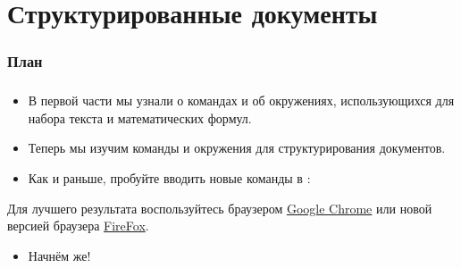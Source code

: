\documentclass{beamer}
\subtitle{Часть 2: Структурированные документы и не только}
\begin{document}
\begin{frame}
\titlepage
\end{frame}

\section{Структурированные документы}

\begin{frame}
\frametitle{План}
\vspace{-3ex}
\begin{multicols}{2}
\tableofcontents[currentsection]
\end{multicols}
\end{frame}

\begin{frame}
\frametitle{\insertsection}
\begin{itemize}
\item В первой части мы узнали о командах и об окружениях, использующихся
  для набора текста и математических формул.
\item Теперь мы изучим команды и окружения для структурирования документов.
\item Как и раньше, пробуйте вводить новые команды в \wllogo{}:
\end{itemize}
\vspace{2ex}
\begin{center}

\vspace{1ex}
\scriptsize
Для лучшего результата воспользуйтесь браузером
\href{http://www.google.com/chrome}{Google Chrome} или новой версией браузера
\href{http://www.mozilla.org/en-US/firefox/new/}{FireFox}.
\end{center}
\vspace{1ex}
\begin{itemize}
\item Начнём же!
\end{itemize}
\end{frame}
\end{document}
